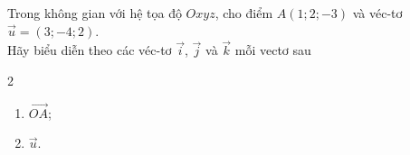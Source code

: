 \begin{bt}%
	Trong không gian với hệ tọa độ $Oxyz$, cho điểm $A(1; 2;-3)$ và véc-tơ $\vec{u}=(3;-4; 2)$.\\
	Hãy biểu diễn theo các véc-tơ $\overrightarrow{i}$, $\overrightarrow{j}$ và $\overrightarrow{k}$ mỗi vectơ sau
	\begin{multicols}{2}
		\begin{enumerate}
			\item $\overrightarrow{OA}$;
			\item $\overrightarrow{u}$.
		\end{enumerate}
	\end{multicols}	
\end{bt}

